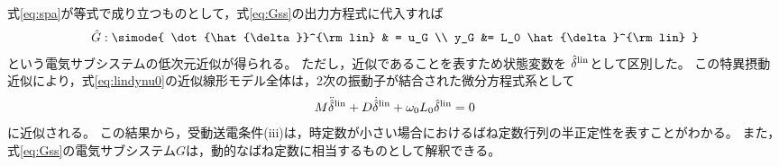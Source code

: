 \documentclass[tombow,dvipdfmx]{corona-a5-1.1}
\begin{document}
式\ref{eq:spa}が等式で成り立つものとして，式\ref{eq:Gss}の出力方程式に代入すれば
\begin{align}\label{eq:Gsssp}
\hat{G}: \simode{
\dot{\hat{\delta}}^{\rm lin} & = u_G \\
y_G &= L_0 \hat{\delta}^{\rm lin}
}
\end{align}
という電気サブシステムの低次元近似が得られる。
ただし，近似であることを表すため状態変数を
$\hat{\delta}^{\rm lin}$として区別した。
この特異摂動近似により，式\ref{eq:lindynu0}の近似線形モデル全体は，2次の振動子が結合された微分方程式系として
\begin{align}\label{eq:spamodel}
M \ddot{\hat{\delta}}^{\rm lin}
+ D \dot{\hat{\delta}}^{\rm lin}
+\omega_0 L_0 \hat{\delta}^{\rm lin}=0
\end{align}
に近似される。
この結果から，受動送電条件(iii)は，時定数が小さい場合におけるばね定数行列の半正定性を表すことがわかる。
また，式\ref{eq:Gss}の電気サブシステム$G$は，動的なばね定数に相当するものとして解釈できる。
\end{document}
